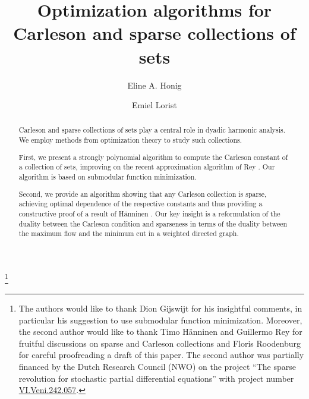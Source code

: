 \documentclass[a4paper, oneside,11pt]{amsart}
\theoremstyle{definition}
\theoremstyle{remark}
\numberwithin{equation}{section}
\begin{document}
\title[Optimization algorithms for Carleson and sparse collections]{Optimization algorithms for Carleson and sparse collections of sets}

\author[E.A. Honig]{Eline A. Honig}
\address[E.A. Honig]{Delft Institute of Applied Mathematics\\
	Delft University of Technology \\ P.O. Box 5031\\ 2600 GA Delft\\The
	Netherlands}
\author[E. Lorist]{Emiel Lorist}
\address[E. Lorist]{Delft Institute of Applied Mathematics\\
	Delft University of Technology \\ P.O. Box 5031\\ 2600 GA Delft\\The
	Netherlands}

\thanks{The authors would like to thank Dion Gijswijt for his insightful comments, in particular his suggestion to use submodular function minimization. Moreover, the second author would like to thank Timo H\"anninen and Guillermo Rey for fruitful discussions on sparse and Carleson collections and Floris Roodenburg for careful proofreading a draft of this paper.
The second author was partially financed by the Dutch Research Council (NWO) on the project ``The sparse revolution for stochastic partial differential equations'' with project number \href{https://doi.org/10.61686/ZGRMR99948}{VI.Veni.242.057}.}
	
\begin{abstract}
Carleson and sparse collections of sets play a central role in dyadic harmonic analysis. We employ methods from optimization theory to study such collections.

 First, we present a strongly polynomial algorithm to compute the Carleson constant of a collection of sets, improving on the recent approximation algorithm of Rey \cite{Re22}. Our algorithm is based on submodular function minimization.

Second, we provide an algorithm showing that any Carleson collection is sparse, achieving optimal dependence of the respective constants and thus providing a constructive proof of a result of H\"anninen \cite{Haen18}.
Our key insight is a reformulation of the duality between the Carleson condition and sparseness in terms of the duality between the maximum flow and the minimum cut in a weighted directed graph.
\end{abstract}
	
\end{document}
